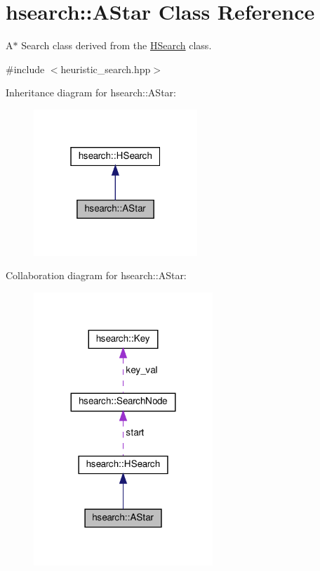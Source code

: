 \hypertarget{classhsearch_1_1AStar}{}\section{hsearch\+:\+:A\+Star Class Reference}
\label{classhsearch_1_1AStar}


A$\ast$ Search class derived from the \hyperlink{classhsearch_1_1HSearch}{H\+Search} class.  




{\ttfamily \#include $<$heuristic\+\_\+search.\+hpp$>$}



Inheritance diagram for hsearch\+:\+:A\+Star\+:\nopagebreak
\begin{figure}[H]
\begin{center}
\leavevmode
\includegraphics[width=175pt]{db/db4/classhsearch_1_1AStar__inherit__graph}
\end{center}
\end{figure}


Collaboration diagram for hsearch\+:\+:A\+Star\+:\nopagebreak
\begin{figure}[H]
\begin{center}
\leavevmode
\includegraphics[width=191pt]{d6/d18/classhsearch_1_1AStar__coll__graph}
\end{center}
\end{figure}
